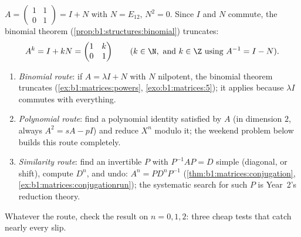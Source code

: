 \begin{example}\label{ex:b1:matrices:powers}
$A = \begin{pmatrix} 1 & 1 \\ 0 & 1\end{pmatrix} = I + N$ with $N =
E_{12}$, $N^2 = 0$. Since $I$ and $N$ commute, the binomial theorem
(\cref{prop:b1:structures:binomial}) truncates:
\[
A^k = I + kN = \begin{pmatrix} 1 & k \\ 0 & 1 \end{pmatrix}
\qquad (k \in \N, \text{ and } k \in \Z \text{ using } A^{-1} = I -
N).
\]
\end{example}

\begin{method}
\label{met:b1:matrices:powers}
\begin{enumerate}
  \item \emph{Binomial route}: if $A = \lambda I + N$ with $N$
        nilpotent, the binomial theorem truncates
        (\cref{ex:b1:matrices:powers}, \cref{exo:b1:matrices:5});
        it applies because $\lambda I$ commutes with everything.
  \item \emph{Polynomial route}: find a polynomial identity
        satisfied by $A$ (in dimension $2$, always $A^2 = sA -
        pI$) and reduce $X^n$ modulo it; the weekend problem
        below builds this route completely.
  \item \emph{Similarity route}: find an invertible $P$ with
        $P^{-1}AP = D$ simple (diagonal, or shift), compute
        $D^n$, and undo: $A^n = P D^n P^{-1}$
        (\cref{thm:b1:matrices:conjugation},
        \cref{ex:b1:matrices:conjugationrun}); the systematic
        search for such $P$ is Year~2's reduction theory.
\end{enumerate}
Whatever the route, check the result on $n = 0, 1, 2$: three
cheap tests that catch nearly every slip.
\end{method}


